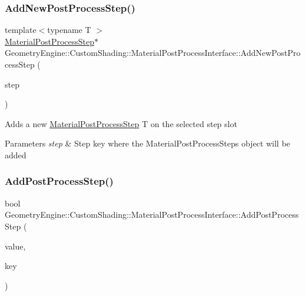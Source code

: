 \subsubsection{\texorpdfstring{AddNewPostProcessStep()}{AddNewPostProcessStep()}}
{\footnotesize\ttfamily template$<$typename T $>$ \\
\mbox{\hyperlink{class_geometry_engine_1_1_custom_shading_1_1_material_post_process_step}{Material\+Post\+Process\+Step}}$\ast$ Geometry\+Engine\+::\+Custom\+Shading\+::\+Material\+Post\+Process\+Interface\+::\+Add\+New\+Post\+Process\+Step (\begin{DoxyParamCaption}\item[{\mbox{\hyperlink{namespace_geometry_engine_1_1_custom_shading_af8b09b91ca7086f4f67a5d4181f35e58}{Material\+Post\+Process\+Steps}}}]{step }\end{DoxyParamCaption})\hspace{0.3cm}{\ttfamily [inline]}}

Adds a new \mbox{\hyperlink{class_geometry_engine_1_1_custom_shading_1_1_material_post_process_step}{Material\+Post\+Process\+Step}} T on the selected step slot 
\begin{DoxyParams}{Parameters}
{\em step} & Step key where the Material\+Post\+Process\+Steps object will be added \\
\hline
\end{DoxyParams}
\mbox{\label{class_geometry_engine_1_1_custom_shading_1_1_material_post_process_interface_a541da18512f4dd5fcc34ab221029e080}} 
\subsubsection{\texorpdfstring{AddPostProcessStep()}{AddPostProcessStep()}}
{\footnotesize\ttfamily bool Geometry\+Engine\+::\+Custom\+Shading\+::\+Material\+Post\+Process\+Interface\+::\+Add\+Post\+Process\+Step (\begin{DoxyParamCaption}\item[{\mbox{\hyperlink{class_geometry_engine_1_1_custom_shading_1_1_material_post_process_step}{Material\+Post\+Process\+Step}} $\ast$}]{value,  }\item[{\mbox{\hyperlink{namespace_geometry_engine_1_1_custom_shading_af8b09b91ca7086f4f67a5d4181f35e58}{Material\+Post\+Process\+Steps}}}]{key }\end{DoxyParamCaption})}

